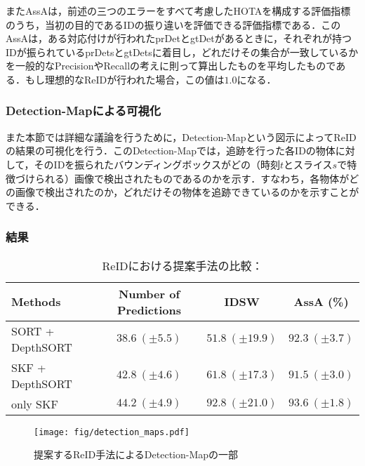         またAssA\cite{luiten2021hota}は，前述の三つのエラーをすべて考慮したHOTAを構成する評価指標のうち，当初の目的であるIDの振り違いを評価できる評価指標である．このAssAは，ある対応付けが行われたprDetとgtDetがあるときに，それぞれが持つIDが振られているprDetsとgtDetsに着目し，どれだけその集合が一致しているかを一般的なPrecisionやRecallの考えに則って算出したものを平均したものである．もし理想的なReIDが行われた場合，この値は$1.0$になる．

        \subsubsection{Detection-Mapによる可視化}

        また本節では詳細な議論を行うために，Detection-Mapという図示によってReIDの結果の可視化を行う．このDetection-Mapでは，追跡を行った各IDの物体に対して，そのIDを振られたバウンディングボックスがどの（時刻$t$とスライス$s$で特徴づけられる）画像で検出されたものであるのかを示す．すなわち，各物体がどの画像で検出されたのか，どれだけその物体を追跡できているのかを示すことができる．

        \subsubsection{結果}

        \begin{table}[t]
            \centering
            \caption[ReIDにおける提案手法の比較]{ReIDにおける提案手法の比較：}
            \label{tab:metrics_reidentification}
            \begin{tabular}{l|ccc}
                Methods & Number of Predictions & IDSW & AssA (\%)
                \\\hline \hline
                SORT + DepthSORT & $38.6 ~ (\pm 5.5)$ & $51.8 ~ (\pm 19.9)$ & $92.3 ~ (\pm 3.7)$
                \\ SKF + DepthSORT & $42.8 ~ (\pm 4.6)$ & $61.8 ~ (\pm 17.3)$ & $91.5 ~ (\pm 3.0)$
                \\ only SKF & $44.2 ~ (\pm 4.9)$ & $92.8 ~ (\pm 21.0)$ & $93.6 ~ (\pm 1.8)$
            \end{tabular}
        \end{table}

        \begin{figure}[t]
            \centering
            \texttt{[image: fig/detection\_maps.pdf]}
            \caption[提案するReID手法によるDetection-Mapの一部]{提案するReID手法によるDetection-Mapの一部}
            \label{fig:detection_map}
        \end{figure}

